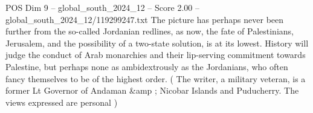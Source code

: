 \begin{textsample}{POS Dim 9 – global\_south\_2024\_12 – Score 2.00 – global\_south\_2024\_12/119299247.txt}
The picture has perhaps never been further from the so-called Jordanian redlines, as now, the fate of Palestinians, Jerusalem, and the possibility of a two-state solution, is at its lowest.
History will judge the conduct of Arab monarchies and their lip-serving commitment towards Palestine, but perhaps none as ambidextrously as the Jordanians, who often fancy themselves to be of the highest order. ( The writer, a military veteran, is a former Lt Governor of Andaman \&amp ; Nicobar Islands and Puducherry.
The views expressed are personal )

\end{textsample}
